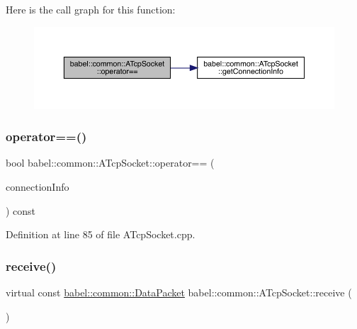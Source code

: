 Here is the call graph for this function\+:\nopagebreak
\begin{figure}[H]
\begin{center}
\leavevmode
\includegraphics[width=350pt]{classbabel_1_1common_1_1_a_tcp_socket_ae6434c16ae66afbcf46e5253da01024c_cgraph}
\end{center}
\end{figure}
\mbox{\label{classbabel_1_1common_1_1_a_tcp_socket_acc33c4655f867911fe8593464818fd76}} 
\subsubsection{\texorpdfstring{operator==()}{operator==()}\hspace{0.1cm}{\footnotesize\ttfamily [2/2]}}
{\footnotesize\ttfamily bool babel\+::common\+::\+A\+Tcp\+Socket\+::operator== (\begin{DoxyParamCaption}\item[{const \mbox{\hyperlink{classbabel_1_1common_1_1_connection_info}{Connection\+Info}} \&}]{connection\+Info }\end{DoxyParamCaption}) const}



Definition at line 85 of file A\+Tcp\+Socket.\+cpp.

\mbox{\label{classbabel_1_1common_1_1_a_tcp_socket_a8bfec8f1b34e75429f9e912ed7108936}} 
\subsubsection{\texorpdfstring{receive()}{receive()}}
{\footnotesize\ttfamily virtual const \mbox{\hyperlink{classbabel_1_1common_1_1_data_packet}{babel\+::common\+::\+Data\+Packet}} babel\+::common\+::\+A\+Tcp\+Socket\+::receive (\begin{DoxyParamCaption}{ }\end{DoxyParamCaption})\hspace{0.3cm}{\ttfamily [pure virtual]}}




